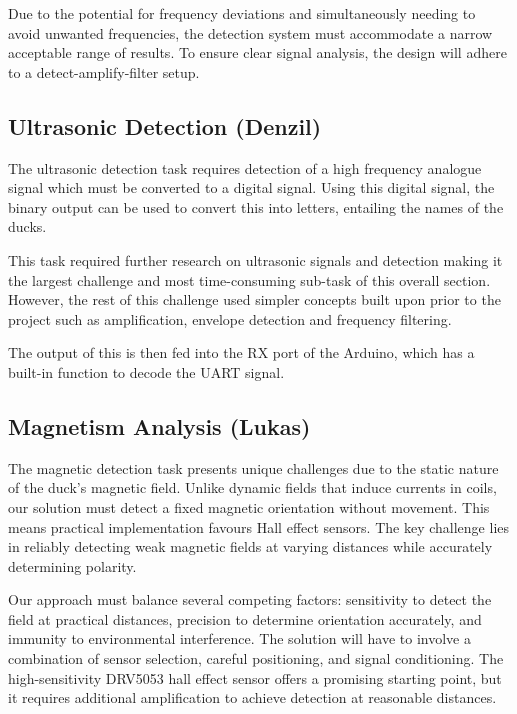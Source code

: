 Due to the potential for frequency deviations and simultaneously needing to avoid unwanted frequencies, the detection system must accommodate a narrow acceptable range of results. To ensure clear signal analysis, the design will adhere to a detect-amplify-filter setup.

\subsection*{Ultrasonic Detection (Denzil)}

The ultrasonic detection task requires detection of a high frequency analogue signal which must be converted to a digital signal. Using this digital signal, the binary output can be used to convert this into letters, entailing the names of the ducks.

This task required further research on ultrasonic signals and detection making it the largest challenge and most time-consuming sub-task of this overall section. However, the rest of this challenge used simpler concepts built upon prior to the project such as amplification, envelope detection and frequency filtering.

The output of this is then fed into the RX port of the Arduino, which has a built-in function to decode the UART signal.

\subsection*{Magnetism Analysis (Lukas)}

The magnetic detection task presents unique challenges due to the static nature of the duck's magnetic field. Unlike dynamic fields that induce currents in coils, our solution must detect a fixed magnetic orientation without movement. This means practical implementation favours Hall effect sensors. The key challenge lies in reliably detecting weak magnetic fields at varying distances while accurately determining polarity.

Our approach must balance several competing factors: sensitivity to detect the field at practical distances, precision to determine orientation accurately, and immunity to environmental interference. The solution will have to involve a combination of sensor selection, careful positioning, and signal conditioning. The high-sensitivity DRV5053 hall effect sensor offers a promising starting point, but it requires additional amplification to achieve detection at reasonable distances.

